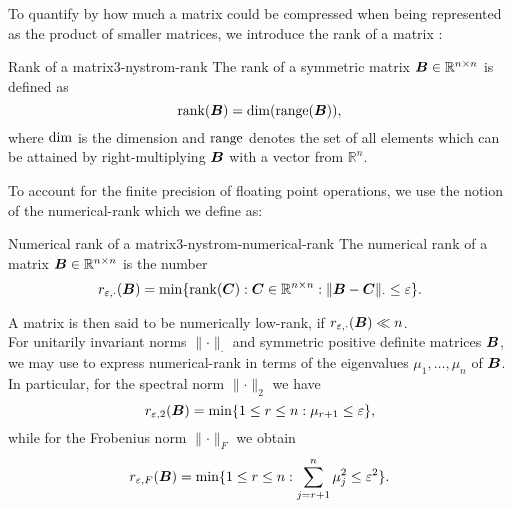To quantify by how much a matrix could be compressed when being represented as the
product of smaller matrices, we introduce the rank of a matrix \cite[section~III.3]{hefferon2012linear}:
\begin{definition}{Rank of a matrix}{3-nystrom-rank}
    The rank of a symmetric matrix $\boldsymbol{B} \in \mathbb{R}^{n \times n}$ is defined as
    \begin{equation}
        \operatorname{rank}(\boldsymbol{B}) = \operatorname{dim}(\operatorname{range}(\boldsymbol{B})),
        \label{equ:3-nystrom-rank}
    \end{equation}
    where $\operatorname{dim}$ is the dimension and $\operatorname{range}$ denotes the set of all elements
    which can be attained by right-multiplying $\boldsymbol{B}$ with a vector from $\mathbb{R}^n$.
\end{definition}

To account for the finite precision of floating point operations, we use the
notion of the \gls{numerical-rank} \cite[definition~1.1]{noga2013rank}
which we define as:
\begin{definition}{Numerical rank of a matrix}{3-nystrom-numerical-rank}
    The numerical rank of a matrix $\boldsymbol{B} \in \mathbb{R}^{n \times n}$ is the number
    \begin{equation}
        r_{\varepsilon, \cdot}(\boldsymbol{B}) = \min \{\operatorname{rank}(\boldsymbol{C}): \boldsymbol{C} \in \mathbb{R}^{n \times n}: \lVert \boldsymbol{B} - \boldsymbol{C} \rVert _{\cdot} \leq \varepsilon \}.
        \label{equ:3-nystrom-def-numerical-rank}
    \end{equation}
\end{definition}
A matrix is then said to be numerically low-rank, if $r_{\varepsilon, \cdot}(\boldsymbol{B}) \ll n$.\\ 

For unitarily invariant norms $\lVert \cdot \rVert _{\cdot}$ and 
symmetric positive definite matrices $\boldsymbol{B}$, we may use
\cite[theorem~5]{mirsky1960truncation} to express \gls{numerical-rank} in terms
of the eigenvalues $\mu_1, \dots, \mu_n$ of $\boldsymbol{B}$.
In particular, for the spectral norm $\lVert \cdot \rVert _2$ we have
\begin{equation}
    r_{\varepsilon, 2}(\boldsymbol{B}) = \min \{1 \leq r \leq n: \mu_{r+1} \leq \varepsilon \},
    \label{equ:3-nystrom-numerical-rank-spectral-norm}
\end{equation}
while for the Frobenius norm $\lVert \cdot \rVert _F$ we obtain
\begin{equation}
    r_{\varepsilon, F}(\boldsymbol{B}) = \min \{1 \leq r \leq n: \sum_{j=r+1}^n \mu_{j}^2 \leq \varepsilon^2 \}.
    \label{equ:3-nystrom-numerical-rank-frobenius-norm}
\end{equation}\\

